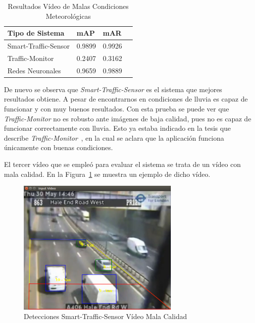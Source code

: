 \begin{table}[H] 
\begin{center}
\begin{tabular}{|l|l|l|l|}
\hline
Tipo de Sistema & mAP & mAR  \\ 
\hline \hline
Smart-Traffic-Sensor & 0.9899 & 0.9926 \\ \hline
Traffic-Monitor & 0.2407 & 0.3162 \\ \hline
Redes Neuronales & 0.9659 & 0.9889\\ \hline
\end{tabular}
\caption{Resultados Vídeo de Malas Condiciones Meteorológicas}
\label{resultados_video_malas_condiciones}
\end{center}
\end{table}

De nuevo se observa que \textit{Smart-Traffic-Sensor} es el sistema que mejores resultados obtiene. A pesar de encontrarnos en condiciones de lluvia es capaz de funcionar y con muy buenos resultados. Con esta prueba se puede ver que \textit{Traffic-Monitor} no es robusto ante imágenes de baja calidad, pues no es capaz de funcionar correctamente con lluvia. Esto ya estaba indicado en la tesis que describe \textit{Traffic-Monitor}~\cite{redo_tesis}, en la cual se aclara que la aplicación funciona únicamente con buenas condiciones.

El tercer vídeo que se empleó para evaluar el sistema se trata de un vídeo con mala calidad. En la Figura~\ref{fig.video_mala_calidad} se muestra un ejemplo de dicho vídeo.


\begin{figure}[H] 
\begin{center}
	\includegraphics[width=0.7\textwidth]{figures/Experimentos/sts_mala_calidad.png}
   \caption{Detecciones Smart-Traffic-Sensor Vídeo Mala Calidad}
	\label{fig.video_mala_calidad}
\end{center}
\end{figure}

